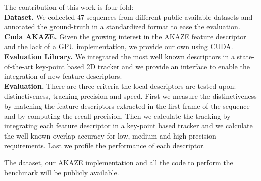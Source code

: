 \documentclass[letterpaper, 10pt, conference]{ieeeconf}
\begin{document}
The contribution of this work is four-fold:\\
\textbf{Dataset.} We collected 47 sequences from different public available datasets and annotated the ground-truth in a standardized format to ease the evaluation.\\
\textbf{Cuda AKAZE.} Given the growing interest in the AKAZE feature descriptor and the lack of a GPU implementation, we provide our own using CUDA.\\
\textbf{Evaluation Library.} We integrated the most well known descriptors in a state-of-the-art key-point based 2D tracker and we provide an interface to enable the integration of new feature descriptors.\\
\textbf{Evaluation.}  There are three criteria the local descriptors are tested upon: distinctiveness, tracking precision and speed. First we measure the distinctiveness by matching the feature descriptors extracted in the first frame of the sequence and by computing the recall-precision. Then we calculate the tracking by integrating each feature descriptor in a key-point based tracker and we calculate the well known overlap accuracy for low, medium and high precision requirements. Last we profile the performance of each descriptor.

The dataset, our AKAZE implementation and all the code to perform the benchmark will be publicly available.





%










%
\end{document}
